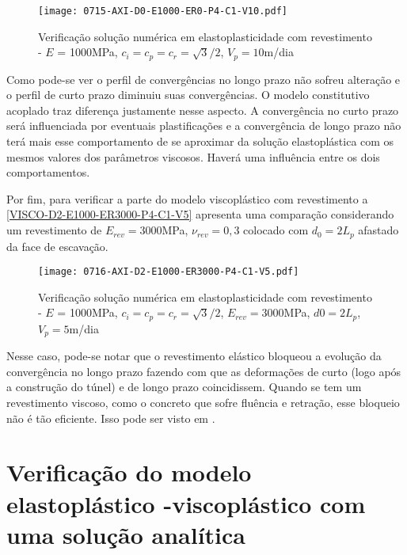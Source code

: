 \begin{figure}[H]
	\begin{center}
		\texttt{[image: 0715-AXI-D0-E1000-ER0-P4-C1-V10.pdf]}
	\end{center}
	\caption{\label{VISCO-D0-E1000-ER0-P4-C1-V10}Verificação solução numérica em elastoplasticidade com revestimento - $E$ = 1000MPa, $c_i=c_p=c_r=\sqrt{3}/2$, $V_p=10$m/dia}
\end{figure}
Como pode-se ver o perfil de convergências no longo prazo não sofreu alteração e o perfil de curto prazo diminuiu suas convergências. O modelo constitutivo acoplado traz diferença justamente nesse aspecto. A convergência no curto prazo será influenciada por eventuais plastificações e a convergência de longo prazo não terá mais esse comportamento de se aproximar da solução elastoplástica com os mesmos valores dos parâmetros viscosos. Haverá uma influência entre os dois comportamentos.

Por fim, para verificar a parte do modelo viscoplástico com revestimento a \autoref{VISCO-D2-E1000-ER3000-P4-C1-V5} apresenta uma comparação considerando um revestimento de $E_{rev}=3000$MPa, $\nu_{rev}=0,3$ colocado com $d_0=2L_p$ afastado da face de escavação.

\begin{figure}[H]
	\begin{center}
		\texttt{[image: 0716-AXI-D2-E1000-ER3000-P4-C1-V5.pdf]}
	\end{center}
	\caption{\label{VISCO-D2-E1000-ER3000-P4-C1-V5}Verificação solução numérica em elastoplasticidade com revestimento - $E$ = 1000MPa, $c_i=c_p=c_r=\sqrt{3}/2$, $E_{rev} = 3000$MPa, $d0=2L_p$, $V_p=5$m/dia}
\end{figure}
Nesse caso, pode-se notar que o revestimento elástico bloqueou a evolução da convergência no longo prazo fazendo com que as deformações de curto (logo após a construção do túnel) e de longo prazo coincidissem. Quando se tem um revestimento viscoso, como o concreto que sofre fluência e retração, esse bloqueio não é tão eficiente. Isso pode ser visto em .


\section{Verificação do modelo elastoplástico -viscoplástico com uma solução analítica}


